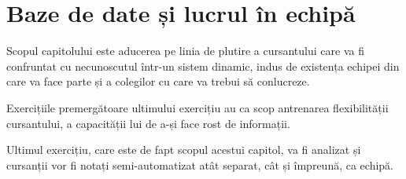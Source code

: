 \chapter{Baze de date și lucrul în echipă}

Scopul capitolului este aducerea pe linia de plutire a cursantului care va
fi confruntat cu necunoscutul într-un sistem dinamic, indus de existența
echipei din care va face parte și a colegilor cu care va trebui să conlucreze.

Exercițiile premergătoare ultimului exercițiu au ca scop antrenarea flexibilității
cursantului, a capacității lui de a-și face rost de informații.

Ultimul exercițiu, care este de fapt scopul acestui capitol, va fi analizat și
cursanții vor fi notați semi-automatizat atât separat, cât și împreună, ca echipă.


